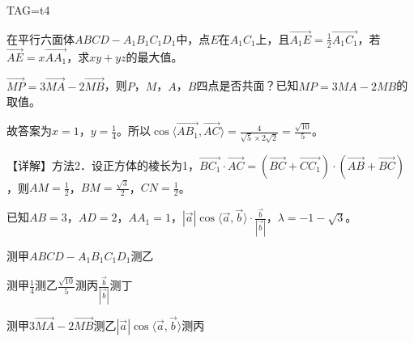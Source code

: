 \documentclass[fontset=none]{ctexart}
\begin{document}
\noindent TAG=t4

\noindent 在平行六面体\(ABCD-A_1B_1C_1D_1\)中，点\(E\)在\(A_1C_1\)上，且\(\overrightarrow{A_1E}=\frac{1}{2}\overrightarrow{A_1C_1}\)，若\(\overrightarrow{AE}=x\overrightarrow{AA_1}\)，求\(xy+yz\)的最大值。

\noindent \(\overrightarrow{MP}=3\overrightarrow{MA}-2\overrightarrow{MB}\)，则\(P\)，\(M\)，\(A\)，\(B\)四点是否共面？已知\(MP=3MA-2MB\)的取值。

\noindent 故答案为\(x=1\)，\(y=\frac{1}{4}\)。所以\(\cos\langle \overrightarrow{AB_1},\overrightarrow{AC}\rangle=\frac{4}{\sqrt{5}\times2\sqrt{2}}=\frac{\sqrt{10}}{5}\)。

\noindent 【详解】方法2．设正方体的棱长为1，\(\overrightarrow{BC_{1}} \cdot \overrightarrow{AC} = ( \overrightarrow{BC} + \overrightarrow{CC_{1}} ) \cdot ( \overrightarrow{AB} + \overrightarrow{BC} )\)，则\(AM = \frac{1}{2}\)，\(BM = \frac{\sqrt{3}}{2}\)，\(CN = \frac{1}{2}\)。

\noindent 已知\(AB=3\)，\(AD=2\)，\(AA_1=1\)，\(| \overrightarrow{a} |\cos\langle \overrightarrow{a},\overrightarrow{b} \rangle \cdot \frac{\overrightarrow{b}}{| \overrightarrow{b} |}\)，\(\lambda=-1-\sqrt{3}\)。

\noindent 测甲\(ABCD-A_1B_1C_1D_1\)测乙

\noindent 测甲\(\frac{1}{4}\)测乙\(\frac{\sqrt{10}}{5}\)测丙\(\frac{\overrightarrow{b}}{| \overrightarrow{b} |}\)测丁

\noindent 测甲\(3\overrightarrow{MA}-2\overrightarrow{MB}\)测乙\(| \overrightarrow{a} |\cos\langle \overrightarrow{a},\overrightarrow{b} \rangle\)测丙
\end{document}
